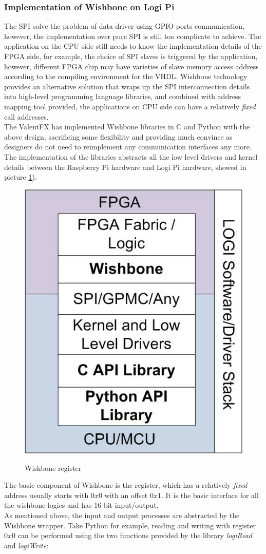 \documentclass[11pt,openright,a4paper]{report}
\begin{document}
\subsubsection{Implementation of Wishbone on Logi Pi}
The SPI solve the problem of data driver using GPIO ports communication, however, the implementation over pure SPI is still too complicate to achieve. The application on the CPU side still needs to know the implementation details of the FPGA side, for example, the choice of SPI slaves is triggered by the application, however, different FPGA chip may have varieties of slave memory access address according to the compiling environment for the VHDL. Wishbone technology provides an alternative solution that wraps up the SPI interconnection details into high-level programming language libraries, and combined with address mapping tool provided, the applications on CPU side can have a relatively \textit{fixed} call addresses.\\
The ValentFX has implemented Wishbone libraries in C and Python\cite{wishbone} with the above design, sacrificing some flexibility and providing much convince as designers do not need to reimplement any communication interfaces any more. The implementation of the libraries abstracts all the low level drivers and kernel details between the Raspberry Pi hardware and Logi Pi hardware, showed in picture \ref{fig:LOGIstack-software-drivers}).\\
\begin{figure}[H]
	\centering
	\includegraphics[width=0.2\linewidth]{"picture/LOGI stack - software - drivers"}
	\caption{Wishbone register}\cite{logiwishbone}
	\label{fig:LOGIstack-software-drivers}
\end{figure}
The basic component of Wishbone is the register, which has a relatively \textit{fixed} address usually starts with $0x0$ with an offset $0x1$. It is the basic interface for all the wishbone logics and has 16-bit input/output\cite{logiwishbone}.\\
As mentioned above, the input and output processes are abstracted by the Wishbone wrapper. Take Python for example, reading and writing with register $0x0$ can be performed using the two functions provided by the library \textit{logiRead} and \textit{logiWrite}:
\end{document}
